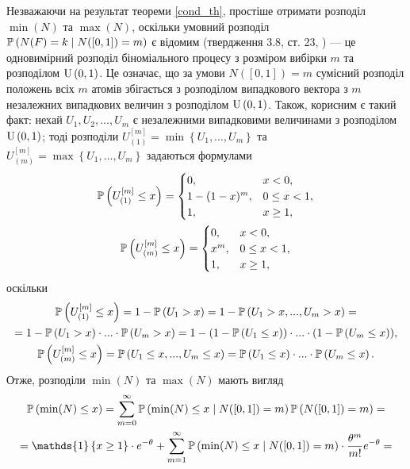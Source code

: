 Незважаючи на результат теореми \ref{cond_th}, простіше отримати розподіл
 $\min(N)$ та $\max(N)$, %
оскільки умовний розподіл $\P{N(F) = k \mid N([0, 1]) = m}$ 
є відомим (твердження 3.8, ст. 23, \cite{last_penrose_2017}) --- це
одновимірний розподіл
біноміального процесу з розміром вибірки $m$ та розподілом $\Unif{0, 1}$.
Це означає, що за умови $N([0, 1]) = m$
сумісний розподіл положень всіх $m$ атомів збігається з 
розподілом випадкового вектора 
з $m$ незалежних 
випадкових величин з розподілом $\Unif{0, 1}$.
Також, корисним є такий факт: нехай $U_1, U_2, \dots, U_m$ є
незалежними випадковими величинами з розподілом $\Unif{0, 1}$;
тоді розподіли $U_{(1)}^{[m]} = \min\left\{U_1, \dots, U_m\right\}$ 
та $U_{(m)}^{[m]} = \max\left\{U_1, \dots, U_m\right\}$ задаються
формулами
\begin{gather*}
    \P{U_{(1)}^{[m]} \leq x} = \begin{cases}
        0, & x < 0, \\
        1 - (1 - x)^m, & 0 \leq x < 1, \\
        1, & x \geq 1,
    \end{cases} \\
    \P{U_{(m)}^{[m]} \leq x} = \begin{cases}
        0, & x < 0, \\
        x^m, & 0 \leq x < 1, \\
        1, & x \geq 1,
    \end{cases}
\end{gather*}
оскільки
\begin{gather*}
    \P{U_{(1)}^{[m]} \leq x} = 1 - \P{U_{{1}} > x} = 1 - \P{U_1 > x, ..., U_m > x} = 
    \\ = 1 - \P{U_1 > x} \cdot ... \cdot \P{U_m > x} = 
    1 - (1 - \P{U_1 \leq x}) \cdot ... \cdot (1 - \P{U_m \leq x}), \\
    \P{U_{(m)}^{[m]} \leq x} = \P{U_1 \leq x, ..., U_m \leq x} = 
    \P{U_1 \leq x} \cdot ... \cdot \P{U_m \leq x}.
\end{gather*}
Отже, розподіли $\min(N)$ та $\max(N)$ мають вигляд
\begin{gather*}
    \P{\min(N) \leq x} = \sum_{m=0}^{\infty} \P{\min(N) \leq x \mid N([0, 1]) = m} \P{N([0, 1]) = m} = \\
     = \mathds{1}\left\{x\geq 1\right\}\cdot e^{-\theta} +
    \sum_{m=1}^{\infty} \P{\min(N) \leq x \mid N([0, 1]) = m} \cdot \frac{\theta^m}{m!} e^{-\theta} = \\
\end{gather*}

